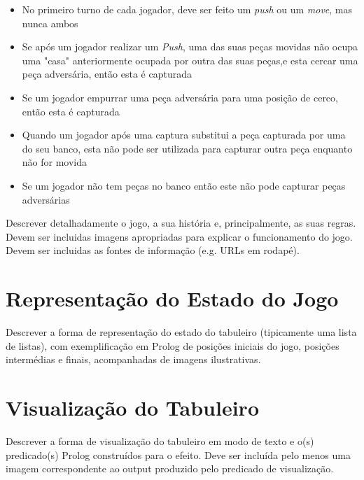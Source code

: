 \documentclass[a4paper]{article}
\begin{document}
\begin{itemize}
	\item No primeiro turno de cada jogador, deve ser feito um \textit{push} ou um \textit{move}, mas nunca ambos
	\item Se após um jogador realizar um \textit{Push}, uma das suas peças movidas não ocupa uma "casa" anteriormente ocupada por outra das suas peças,e esta cercar uma peça adversária, então esta é capturada
	\item Se um jogador empurrar uma peça adversária para uma posição de cerco, então esta é capturada
	\item Quando um jogador após uma captura substitui a peça capturada por uma do seu banco, esta não pode ser utilizada para capturar outra peça enquanto não for movida
	\item Se um jogador não tem peças no banco então este não pode capturar peças adversárias
\end{itemize}

Descrever detalhadamente o jogo, a sua história e, principalmente, as suas regras.
Devem ser incluidas imagens apropriadas para explicar o funcionamento do jogo.
Devem ser incluidas as fontes de informação (e.g. URLs em rodapé).


\section{Representação do Estado do Jogo}

Descrever a forma de representação do estado do tabuleiro (tipicamente uma lista de listas), com exemplificação em Prolog de posições iniciais do jogo, posições intermédias e finais, acompanhadas de imagens ilustrativas.


\section{Visualização do Tabuleiro}

Descrever a forma de visualização do tabuleiro em modo de texto e o(s) predicado(s) Prolog construídos para o efeito.
Deve ser incluída pelo menos uma imagem correspondente ao output produzido pelo predicado de visualização.
\end{document}
